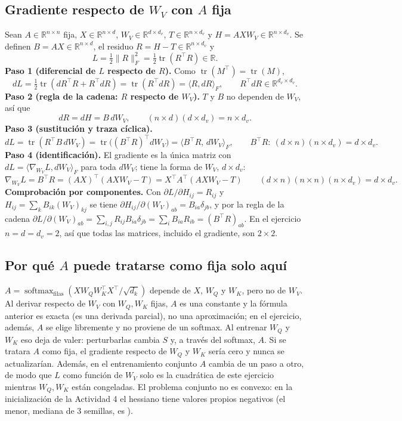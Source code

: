 \documentclass[10pt]{article}
\newcommand{\R}{\mathbb{R}}
\newcommand{\tr}{\operatorname{tr}}
\begin{document}
\subsection{Gradiente respecto de $W_V$ con $A$ fija}
Sean $A\in\R^{n\times n}$ fija, $X\in\R^{n\times d}$, $W_V\in\R^{d\times d_v}$, $T\in\R^{n\times d_v}$
y $H = AXW_V\in\R^{n\times d_v}$. Se definen $B = AX\in\R^{n\times d}$, el residuo
$R = H - T\in\R^{n\times d_v}$ y
\[
  L = \tfrac12\|R\|_F^2 = \tfrac12\tr(R^\top R)\in\R .
\]
\textbf{Paso 1 (diferencial de $L$ respecto de $R$).} Como $\tr(M^\top)=\tr(M)$,
\[
  dL = \tfrac12\tr(dR^\top R + R^\top dR) = \tr(R^\top dR) = \langle R, dR\rangle_F,
  \qquad R^\top dR\in\R^{d_v\times d_v}.
\]
\textbf{Paso 2 (regla de la cadena: $R$ respecto de $W_V$).} $T$ y $B$ no dependen de $W_V$, así que
\[
  dR = dH = B\,dW_V, \qquad (n\times d)(d\times d_v) = n\times d_v .
\]
\textbf{Paso 3 (sustitución y traza cíclica).}
\[
  dL = \tr(R^\top B\, dW_V) = \tr\big((B^\top R)^\top dW_V\big) = \langle B^\top R,\, dW_V\rangle_F,
  \qquad B^\top R:\ (d\times n)(n\times d_v) = d\times d_v .
\]
\textbf{Paso 4 (identificación).} El gradiente es la única matriz con $dL = \langle\nabla_{W_V}L,
dW_V\rangle_F$ para toda $dW_V$; tiene la forma de $W_V$, $d\times d_v$:
\[
  \boxed{\nabla_{W_V}L = B^\top R = (AX)^\top(AXW_V - T) = X^\top A^\top(AXW_V - T)}
  \qquad (d\times n)(n\times n)(n\times d_v) = d\times d_v .
\]
\textbf{Comprobación por componentes.} Con $\partial L/\partial H_{ij} = R_{ij}$ y
$H_{ij} = \sum_k B_{ik}(W_V)_{kj}$ se tiene $\partial H_{ij}/\partial(W_V)_{ab} = B_{ia}\delta_{jb}$, y
por la regla de la cadena
$\partial L/\partial(W_V)_{ab} = \sum_{i,j} R_{ij}B_{ia}\delta_{jb} = \sum_i B_{ia}R_{ib} = (B^\top R)_{ab}$.
En el ejercicio $n = d = d_v = 2$, así que todas las matrices, incluido el gradiente, son $2\times2$.

\subsection{Por qué $A$ puede tratarse como fija solo aquí}
$A = \operatorname{softmax}_{\text{filas}}(XW_QW_K^\top X^\top/\sqrt{d_k})$ depende de $X$, $W_Q$ y
$W_K$, pero no de $W_V$. Al derivar respecto de $W_V$ con $W_Q, W_K$ fijas, $A$ es una constante y la
fórmula anterior es exacta (es una derivada parcial), no una aproximación; en el ejercicio, además,
$A$ se elige libremente y no proviene de un softmax. Al entrenar $W_Q$ y $W_K$ eso deja de valer:
perturbarlas cambia $S$ y, a través del softmax, $A$. Si se tratara $A$ como fija, el gradiente
respecto de $W_Q$ y $W_K$ sería cero y nunca se actualizarían. Además, en el entrenamiento conjunto
$A$ cambia de un paso a otro, de modo que $L$ como función de $W_V$ solo es la cuadrática de este
ejercicio mientras $W_Q, W_K$ están congeladas. El problema conjunto no es convexo: en la
inicialización de la Actividad 4 el hessiano tiene valores propios negativos (el menor, mediana de 3
semillas, es ).
\end{document}
